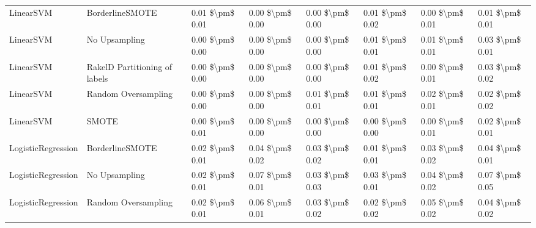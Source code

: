 \begin{tabular}{llllllll}
                      LinearSVM &               BorderlineSMOTE & 0.01 \$\textbackslash pm\$ 0.01 &           0.00 \$\textbackslash pm\$ 0.00 &       0.00 \$\textbackslash pm\$ 0.00 &        0.01 \$\textbackslash pm\$ 0.02 &                         0.00 \$\textbackslash pm\$ 0.01 &     0.01 \$\textbackslash pm\$ 0.01 \\
                      LinearSVM &                 No Upsampling & 0.00 \$\textbackslash pm\$ 0.00 &           0.00 \$\textbackslash pm\$ 0.00 &       0.00 \$\textbackslash pm\$ 0.00 &        0.01 \$\textbackslash pm\$ 0.01 &                         0.01 \$\textbackslash pm\$ 0.01 &     0.03 \$\textbackslash pm\$ 0.01 \\
                      LinearSVM & RakelD Partitioning of labels & 0.00 \$\textbackslash pm\$ 0.00 &           0.00 \$\textbackslash pm\$ 0.00 &       0.00 \$\textbackslash pm\$ 0.00 &        0.01 \$\textbackslash pm\$ 0.02 &                         0.00 \$\textbackslash pm\$ 0.01 &     0.03 \$\textbackslash pm\$ 0.02 \\
                      LinearSVM &           Random Oversampling & 0.00 \$\textbackslash pm\$ 0.00 &           0.00 \$\textbackslash pm\$ 0.00 &       0.01 \$\textbackslash pm\$ 0.01 &        0.01 \$\textbackslash pm\$ 0.01 &                         0.02 \$\textbackslash pm\$ 0.01 &     0.02 \$\textbackslash pm\$ 0.02 \\
                      LinearSVM &                         SMOTE & 0.00 \$\textbackslash pm\$ 0.01 &           0.00 \$\textbackslash pm\$ 0.00 &       0.00 \$\textbackslash pm\$ 0.00 &        0.00 \$\textbackslash pm\$ 0.00 &                         0.00 \$\textbackslash pm\$ 0.01 &     0.02 \$\textbackslash pm\$ 0.01 \\
             LogisticRegression &               BorderlineSMOTE & 0.02 \$\textbackslash pm\$ 0.01 &           0.04 \$\textbackslash pm\$ 0.02 &       0.03 \$\textbackslash pm\$ 0.02 &        0.01 \$\textbackslash pm\$ 0.01 &                         0.03 \$\textbackslash pm\$ 0.02 &     0.04 \$\textbackslash pm\$ 0.01 \\
             LogisticRegression &                 No Upsampling & 0.02 \$\textbackslash pm\$ 0.01 &           0.07 \$\textbackslash pm\$ 0.01 &       0.03 \$\textbackslash pm\$ 0.03 &        0.03 \$\textbackslash pm\$ 0.01 &                         0.04 \$\textbackslash pm\$ 0.02 &     0.07 \$\textbackslash pm\$ 0.05 \\
             LogisticRegression &           Random Oversampling & 0.02 \$\textbackslash pm\$ 0.01 &           0.06 \$\textbackslash pm\$ 0.01 &       0.03 \$\textbackslash pm\$ 0.02 &        0.02 \$\textbackslash pm\$ 0.02 &                         0.05 \$\textbackslash pm\$ 0.02 &     0.04 \$\textbackslash pm\$ 0.02 \\

\end{tabular}
